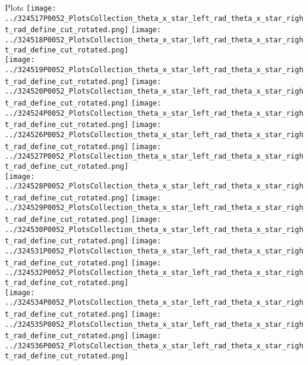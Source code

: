 \documentclass{beamer}
\begin{document}
\begin{frame}
\begin{block}{Plots}
                \texttt{[image: ../324517P0052\_PlotsCollection\_theta\_x\_star\_left\_rad\_theta\_x\_star\_right\_rad\_define\_cut\_rotated.png]}
                \texttt{[image: ../324518P0052\_PlotsCollection\_theta\_x\_star\_left\_rad\_theta\_x\_star\_right\_rad\_define\_cut\_rotated.png]}\\
                \texttt{[image: ../324519P0052\_PlotsCollection\_theta\_x\_star\_left\_rad\_theta\_x\_star\_right\_rad\_define\_cut\_rotated.png]}
                \texttt{[image: ../324520P0052\_PlotsCollection\_theta\_x\_star\_left\_rad\_theta\_x\_star\_right\_rad\_define\_cut\_rotated.png]}
                \texttt{[image: ../324524P0052\_PlotsCollection\_theta\_x\_star\_left\_rad\_theta\_x\_star\_right\_rad\_define\_cut\_rotated.png]}
                \texttt{[image: ../324526P0052\_PlotsCollection\_theta\_x\_star\_left\_rad\_theta\_x\_star\_right\_rad\_define\_cut\_rotated.png]}
                \texttt{[image: ../324527P0052\_PlotsCollection\_theta\_x\_star\_left\_rad\_theta\_x\_star\_right\_rad\_define\_cut\_rotated.png]}\\
                \texttt{[image: ../324528P0052\_PlotsCollection\_theta\_x\_star\_left\_rad\_theta\_x\_star\_right\_rad\_define\_cut\_rotated.png]}
                \texttt{[image: ../324529P0052\_PlotsCollection\_theta\_x\_star\_left\_rad\_theta\_x\_star\_right\_rad\_define\_cut\_rotated.png]}
                \texttt{[image: ../324530P0052\_PlotsCollection\_theta\_x\_star\_left\_rad\_theta\_x\_star\_right\_rad\_define\_cut\_rotated.png]}
                \texttt{[image: ../324531P0052\_PlotsCollection\_theta\_x\_star\_left\_rad\_theta\_x\_star\_right\_rad\_define\_cut\_rotated.png]}
                \texttt{[image: ../324532P0052\_PlotsCollection\_theta\_x\_star\_left\_rad\_theta\_x\_star\_right\_rad\_define\_cut\_rotated.png]}\\
                \texttt{[image: ../324534P0052\_PlotsCollection\_theta\_x\_star\_left\_rad\_theta\_x\_star\_right\_rad\_define\_cut\_rotated.png]}
                \texttt{[image: ../324535P0052\_PlotsCollection\_theta\_x\_star\_left\_rad\_theta\_x\_star\_right\_rad\_define\_cut\_rotated.png]}
                \texttt{[image: ../324536P0052\_PlotsCollection\_theta\_x\_star\_left\_rad\_theta\_x\_star\_right\_rad\_define\_cut\_rotated.png]}

        \end{block}
\end{frame}
\end{document}
